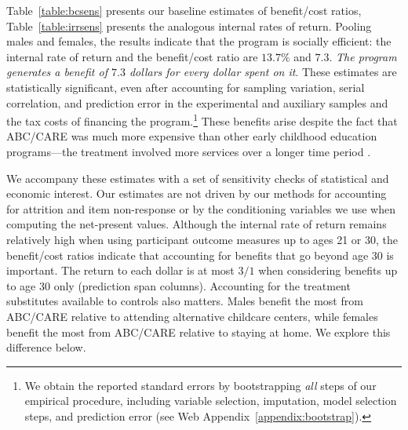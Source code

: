 Table~\ref{table:bcsens} presents our baseline estimates of benefit/cost ratios, Table~\ref{table:irrsens} presents the analogous internal rates of return. Pooling males and females, the results indicate that the program is socially efficient: the internal rate of return and the benefit/cost ratio are $13.7\%$ and $7.3$. \textit{The program generates a benefit of $7.3$ dollars for every dollar spent on it}. These estimates are statistically significant, even after accounting for sampling variation, serial correlation, and prediction error in the experimental and auxiliary samples and the tax costs of financing the program.\footnote{We obtain the reported standard errors by bootstrapping \emph{all} steps of our empirical procedure, including variable selection, imputation, model selection steps, and prediction error (see Web Appendix~\ref{appendix:bootstrap}).} These benefits arise despite the fact that ABC/CARE was much more expensive than other early childhood education programs---the treatment involved more services over a longer time period \citep{Elango_Hojman_etal_2016_Early-Edu}.

We accompany these estimates with a set of sensitivity checks of statistical and economic interest. Our estimates are not driven by our methods for accounting for attrition and item non-response or by the conditioning variables we use when computing the net-present values. Although the internal rate of return remains relatively high when using participant outcome measures up to ages 21 or 30, the benefit/cost ratios indicate that accounting for benefits that go beyond age 30 is important. The return to each dollar is at most $3/1$ when considering benefits up to age 30 only (prediction span columns). Accounting for the treatment substitutes available to controls also matters. Males benefit the most from ABC/CARE relative to attending alternative childcare centers, while females benefit the most from ABC/CARE relative to staying at home. We explore this difference below.

